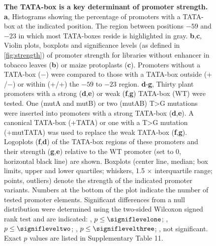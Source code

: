 \documentclass[10pt, english]{article}
\newcommand{\fignormal}{\scriptsize}
\newcommand{\titleend}{ }
\newcommand{\nextentry}{ }
\newcounter{fig}
\newenvironment{fig}{%
	\begin{figure}%
		\stepcounter{fig}%
		\pdfbookmark{\figurename\ \thefig}{figure\thefig}
		\tikzsetnextfilename{figure\thefig}%
		\fignormal%
		\centering%
}{%
	\end{figure}%
	\clearpage
}
\newif\ifsubfigupper
\newcounter{subfig}[figure]
\newcommand{\plainsubfigref}[1]{\textbf{\ifsubfigupper\uppercase{#1}\else\lowercase{#1}\fi}}
\newcommand{\subfigref}[1]{\textbf{\plainsubfigref{#1}},}
\newcommand{\subfigrange}[2]{\textbf{\plainsubfigref{#1}}-\textbf{\plainsubfigref{#2}},}
\newcommand{\parensubfig}[2][]{(#1\textbf{\plainsubfigref{#2}})}
\begin{document}
		\begin{fig}
			\caption{%
				\textbf{The TATA-box is a key determinant of promoter strength.}\titleend
				\subfigref{A} Histograms showing the percentage of promoters with a TATA-box at the indicated position. The region between positions $-59$ and $-23$ in which most TATA-boxes reside is highlighted in gray.\nextentry
				\subfigref{B}\subfigref{C} Violin plots, boxplots and significance levels (as defined in \autoref{fig:strength}) of promoter strength for libraries without enhancer in tobacco leaves \parensubfig{B} or maize protoplasts \parensubfig{C}. Promoters without a TATA-box ($-$) were compared to those with a TATA-box outside ($+$/$-$) or within ($+$/$+$) the $-59$ to $-23$ region.\nextentry
				\subfigrange{D}{G} Thirty plant promoters with a strong \parensubfig[\subfigref{D}]{E} or weak \parensubfig[\subfigref{F}]{G} TATA-box (WT) were tested. One (mutA and mutB) or two (mutAB) T>G mutations were inserted into promoters with a strong TATA-box \parensubfig[\subfigref{D}]{E}. A canonical TATA-box (+TATA) or one with a T>G mutation (+mutTATA) was used to replace the weak TATA-box \parensubfig[\subfigref{F}]{G}. Logoplots \parensubfig[\subfigref{F}]{D} of the TATA-box regions of these promoters  and their strength \parensubfig[\subfigref{G}]{E} relative to the WT promoter (set to 0, horizontal black line) are shown. Boxplots (center line, median; box limits, upper and lower quartiles; whiskers, 1.5 $\times$ interquartile range; points, outliers) denote the strength of the indicated promoter variants. Numbers at the bottom of the plot indicate the number of tested promoter elements. Significant differences from a null distribution were determined using the two-sided Wilcoxon signed rank test and are indicated: \issignif, $p \leq \signiflevelone$; \issignif\issignif, $p \leq \signifleveltwo$; \issignif\issignif\issignif, $p \leq \signiflevelthree$; \notsignif, not significant. Exact $p$ values are listed in Supplementary Table 11.
			}%
			\label{fig:TATA}%
		\end{fig}
\end{document}
